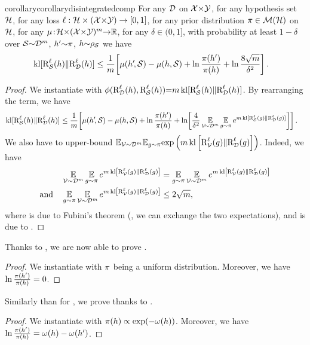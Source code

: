\documentclass[twoside]{article}
\theoremstyle{plain}
\begin{document}
\begin{restatable}{corollary}{corollarydisintegratedcomp}\label{corollary:disintegrated-comp}
For any $\Dcal$ on $\Xcal{\times}\Ycal$, for any hypothesis set $\Hcal$, for any loss $\loss : \Hcal\times(\Xcal{\times}\Ycal) \to [0,1]$, for any prior distribution $\P\in\Mcal(\Hcal)$ on $\Hcal$, for any $\comp\!:\! \Hcal{\times}(\Xcal{\times}\Ycal)^m{\to}\R$, for any $\delta\!\in\!(0,1]$, with probability at least $1{-}\delta$ over $\Scal{\sim}\Dcal^m$, $h'{\sim}\P$, $h{\sim}\AQ$ we have
\begin{align*}
\kl[\RiskLoss_{\Scal}(h) \|\RiskLoss_{\Dcal}(h)] &\le \frac{1}{m}\!\LB\comp(h'\!,\Scal) - \comp(h,\Scal) +\ln\frac{\P(h')}{\P(h)} + \ln\frac{8\sqrt{m}}{\delta^2}\RB.
\end{align*}
\end{restatable}
\begin{proof}
We instantiate  with $\phi(\RiskLoss_{\Dcal}(h), \RiskLoss_{\Scal}(h)){=}m\kl[\RiskLoss_{\Scal}(h)\|\RiskLoss_{\Dcal}(h)]$.
By rearranging the term, we have 
\begin{align*}
\kl[\RiskLoss_{\Scal}(h) \|\RiskLoss_{\Dcal}(h)] &\le \frac{1}{m}\!\LB\comp(h'\!,\Scal) - \comp(h,\Scal) +\ln\frac{\P(h')}{\P(h)} + \ln\!\left[\frac{4}{\delta^2} \EE_{\Vcal\!{\sim}\Dcal^m}\EE_{g{\sim}\P} e^{m\kl[\RiskLoss_{\Scal}(g) \|\RiskLoss_{\Dcal}(g)]}\right]\RB.
\end{align*}
We also have to upper-bound $\EE_{\Vcal\sim\Dcal^m}\!\EE_{g\sim\P}\!\exp\LP m\kl\LB\RiskLoss_{\Vcal}(g) \|\RiskLoss_{\Dcal}(g)\RB\RP$. 
Indeed, we have
\begin{align}
    \EE_{\Vcal\sim\Dcal^m}\EE_{g\sim\P}e^{m\kl\LB\RiskLoss_{\Vcal}(g) \|\RiskLoss_{\Dcal}(g)\RB}  &=  \EE_{g\sim\P}\EE_{\Vcal\sim\Dcal^m}e^{m\kl\LB\RiskLoss_{\Vcal}(g) \|\RiskLoss_{\Dcal}(g)\RB}\label{eq:proof-corollary-disintegrated-comp-1}\\
    \text{and}\quad \EE_{g\sim\P}\EE_{\Vcal\sim\Dcal^m}e^{m\kl\LB\RiskLoss_{\Vcal}(g) \|\RiskLoss_{\Dcal}(g)\RB}  &\leq 2\sqrt{m}\label{eq:proof-corollary-disintegrated-comp-2},
\end{align}
where  is due to Fubini's theorem (\ie, we can exchange the two expectations), and  is due to \citet{maurer2004note}.
\end{proof}
Thanks to , we are now able to prove .
\corollarydisintegratedcompunif*
\begin{proof}
We instantiate  with $\P$ being a uniform distribution. 
Moreover, we have $\ln\frac{\P(h')}{\P(h)}=0$.  
\end{proof}
Similarly than for , we prove  thanks to .
\corollarydisintegratedcompdata*
\begin{proof}
We instantiate  with $\P(h)\propto \exp(-\omega(h))$.
Moreover, we have $\ln\frac{\P(h')}{\P(h)}=\omega(h)-\omega(h')$.
\end{proof}
\end{document}
